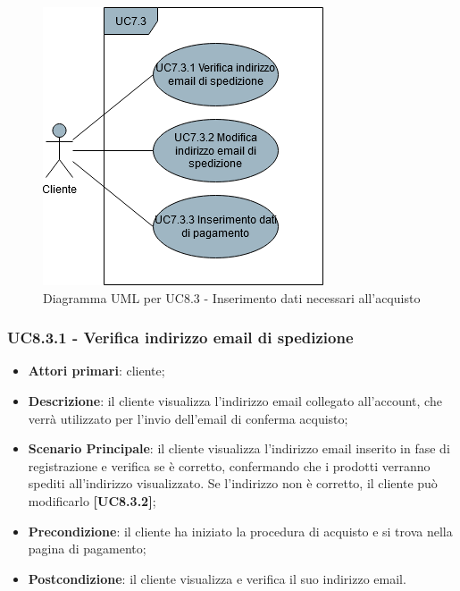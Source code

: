 \begin{figure}[H]
\centering
\includegraphics[scale=0.6]{res/UseCase/Immagini/InserimentoDatiAcquisto}
\caption{Diagramma UML per UC8.3 - Inserimento dati necessari all'acquisto}
\end{figure}

\subsubsection{UC8.3.1 - Verifica indirizzo email di spedizione}
\begin{itemize}
\item \textbf{Attori primari}: cliente;
\item \textbf{Descrizione}: il cliente visualizza l'indirizzo email collegato all'account, che verrà utilizzato per l'invio dell'email di conferma acquisto;
\item \textbf{Scenario Principale}: il cliente visualizza l'indirizzo email inserito in fase di registrazione e verifica se è corretto, confermando che i prodotti verranno spediti all'indirizzo visualizzato. Se l'indirizzo non è corretto, il cliente può modificarlo \textbf{[UC8.3.2]};
\item \textbf{Precondizione}:  il cliente ha iniziato la procedura di acquisto e si trova nella pagina di pagamento;
\item \textbf{Postcondizione}: il cliente visualizza e verifica il suo indirizzo email.
\end{itemize}

